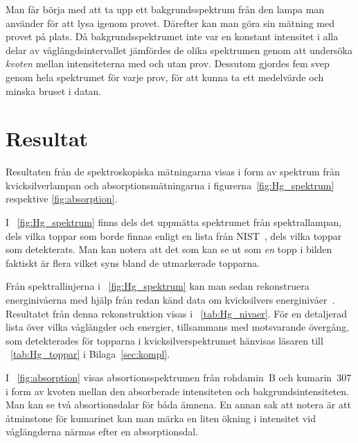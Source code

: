 \documentclass[11pt,a4paper]{article}
\newcommand{\figref}{\figurename~\ref}
\newcommand{\tabref}{\tablename~\ref} %
\begin{document}
Man får börja med att ta upp ett bakgrundsspektrum från den lampa man
använder för att lysa igenom provet. Därefter kan man göra sin mätning
med provet på plats. Då bakgrundsspektrumet inte var en konstant
intensitet i alla delar av våglängdsintervallet jämfördes de olika
spektrumen genom att undersöka \emph{kvoten} mellan intensiteterna med
och utan prov. Dessutom gjordes fem svep genom hela spektrumet för
varje prov, för att kunna ta ett medelvärde och minska bruset i datan. 


\section{Resultat}
Resultaten från de spektroskopiska mätningarna visas i form av
spektrum från kvicksilverlampan och absorptionsmätningarna i
figurerna~\ref{fig:Hg_spektrum} respektive \ref{fig:absorption}.

I \figref{fig:Hg_spektrum} finns dels det uppmätta spektrumet från
spektrallampan, dels vilka toppar som borde finnas enligt en lista
från NIST~\cite{NIST_spectrum}, dels vilka toppar som detekterats. Man
kan notera att det som kan se ut som \emph{en} topp i bilden faktiskt
är flera vilket syns bland de utmarkerade topparna.

Från spektrallinjerna i \figref{fig:Hg_spektrum} kan man sedan
rekonstruera energinivåerna med hjälp från redan känd data om
kvicksilvers energinivåer~\cite{NIST_levels}. Resultatet från denna
rekonstruktion visas i \tabref{tab:Hg_nivaer}.
För en detaljerad lista över vilka våglängder och energier, tillsammans
med motsvarande övergång, som detekterades för topparna i
kvicksilverspektrumet hänvisas läsaren till \tabref{tab:Hg_toppar} i
Bilaga~\ref{sec:kompl}. 



I \figref{fig:absorption} visas absortionsspektrumen från rohdamin~B
och kumarin~307 i form av kvoten mellan den absorberade intensiteten
och bakgrundsintensiteten. Man kan se två absortionsdalar för båda
ämnena. En annan sak att notera 
är att åtminstone för kumarinet kan man märka en liten ökning i
intensitet vid våglängderna närmas efter en absorptionsdal. 
\end{document}
